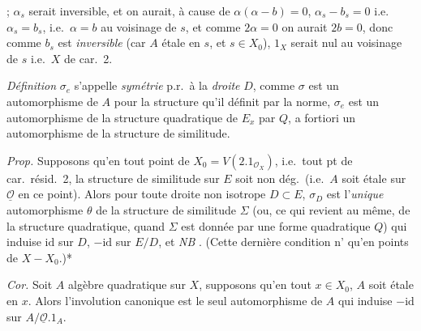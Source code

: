 \documentclass[11pt,a4paper]{article}
\begin{document}
;
$\alpha_s$ serait inversible, et on aurait, à cause de  $\alpha(\alpha - b) = 0$, $\alpha_s - b_s = 0$ i.e.\ $\alpha_s = b_s$,  i.e.\ $\alpha = b$ au voisinage de $s$,  et comme $2\alpha = 0$ on aurait $2b = 0$, donc comme $b_s$ est \emph{inversible} (car $A$ étale en $s$, et $s \in X_0$),  $1_X$ serait nul au voisinage de $s$ i.e.\ $X$ de car.\ 2.

\emph{Définition} $\sigma_e$ s'appelle \emph{symétrie} p.r.\ à la \emph{droite} $D$, comme $\sigma$ est un automorphisme de $A$ pour la structure qu'il définit par la norme, $\sigma_e$ est un automorphisme de la structure quadratique de $E_x$ par $Q$, a fortiori un automorphisme de la structure de similitude.

\emph{Prop.} Supposons qu'en tout point de $X_0 = V(2.1_{\mathcal{O}_X})$, i.e.\ tout pt de car.\ résid.\ 2, la structure de similitude  sur $E$ soit non dég.\ (i.e.\ $A$ soit étale sur $\underline{\mathcal{O}}$ en ce point). Alors pour toute droite  non isotrope $D \subset E$, $\sigma_D$ est l'\emph{unique} automorphisme $\theta$ de la structure de similitude $\Sigma$ (ou, ce qui revient au même, de la structure quadratique, quand $\Sigma$ est donnée par une forme quadratique $Q$)  qui induise $\mathrm{id}$ sur $D$, $-\mathrm{id}$ sur $E/D$, et  \emph{NB}  \struck{\ill{}}  \struck{\ill{}} . (Cette dernière condition n'  qu'en points de $X - X_0$.)*

\emph{Cor.} Soit $A$ algèbre quadratique sur $X$, supposons qu'en tout $x \in X_0$, $A$ soit étale en $x$. Alors l'involution canonique est le seul automorphisme  de $A$ qui induise $-\mathrm{id}$ sur $A/\underline{\mathcal{O}}.1_A$.
\end{document}

